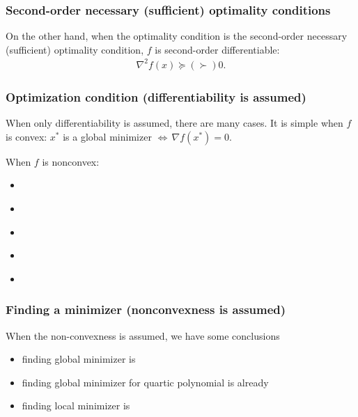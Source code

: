 	\subsubsection{Second-order necessary (sufficient) optimality conditions}
On the other hand, when the optimality condition is the second-order necessary (sufficient) optimality condition, $f$ is second-order differentiable: 
\begin{eqnarray*}
	    	\nabla^2 f(x)\succeq (\succ) 0.
\end{eqnarray*}



	\subsubsection{Optimization condition (differentiability is assumed)}
When only differentiability is assumed, there are many cases.
It is simple when $f$ is convex: $x^*$ is a global minimizer $\Leftrightarrow\,\nabla f(x^*)=0$.

When $f$ is nonconvex:
		\begin{itemize}
			\item {}\\[1mm]
			\item {}\\[1mm]
			\item {}\\[1mm]
			\item {}\\[1mm]
			\item {}
		\end{itemize}
	

	\subsubsection{Finding a minimizer (nonconvexness is assumed)}
When the non-convexness is assumed, we have some conclusions
	\begin{itemize}
		\item finding global minimizer is 
		\item finding global minimizer for quartic polynomial is already 
		\item finding local minimizer is 
	\end{itemize}

